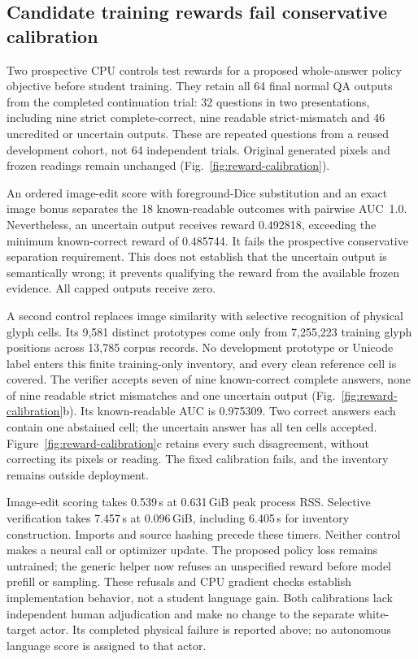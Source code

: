 \documentclass[12pt,a4paper]{article}
\providecommand{\DIFadd}[1]{{\protect\color{blue} \sf #1}} %
\begin{document}
\subsection*{\DIFadd{Candidate training rewards fail conservative calibration}}

\DIFadd{Two prospective CPU controls test rewards for a proposed whole-answer policy
objective before student training. They retain all 64 final normal QA outputs
from the completed continuation trial: 32 questions in two presentations,
including nine strict complete-correct, nine readable strict-mismatch and
46 uncredited or uncertain outputs. These are repeated questions from a reused
development cohort, not 64 independent trials. Original generated pixels and
frozen readings remain unchanged (Fig.~\ref{fig:reward-calibration}).
}

\DIFadd{An ordered image-edit score with foreground-Dice substitution and an exact
image bonus separates the 18 known-readable outcomes with pairwise AUC~1.0.
Nevertheless, an uncertain output receives reward 0.492818, exceeding the
minimum known-correct reward of 0.485744. It fails the prospective conservative
separation requirement. This does not establish that the uncertain output is
semantically wrong; it prevents qualifying the reward from the available
frozen evidence. All capped outputs receive zero.
}

\DIFadd{A second control replaces image similarity with selective recognition of
physical glyph cells. Its 9,581 distinct prototypes come only from 7,255,223
training glyph positions across 13,785 corpus records. No development prototype
or Unicode label enters this finite training-only inventory, and every clean
reference cell is covered. The verifier accepts seven of nine known-correct
complete answers, none of nine readable strict mismatches and one uncertain
output (Fig.~\ref{fig:reward-calibration}b). Its known-readable AUC is 0.975309.
Two correct answers each contain one abstained cell; the uncertain answer has
all ten cells accepted. Figure~\ref{fig:reward-calibration}c retains every such
disagreement, without correcting its pixels or reading. The fixed calibration
fails, and the inventory remains outside deployment.
}

\DIFadd{Image-edit scoring takes 0.539\,s at 0.631\,GiB peak process RSS. Selective
verification takes 7.457\,s at 0.096\,GiB, including 6.405\,s for inventory
construction. Imports and source hashing precede these timers. Neither control
makes a neural call or optimizer update. The proposed policy loss remains
untrained; the generic helper now refuses an unspecified reward before model
prefill or sampling. These refusals and CPU gradient checks establish
implementation behavior, not a student language gain. Both calibrations lack
independent human adjudication and make no change to the separate white-target
actor. Its completed physical failure is reported above; no autonomous language
score is assigned to that actor.
}
\end{document}
